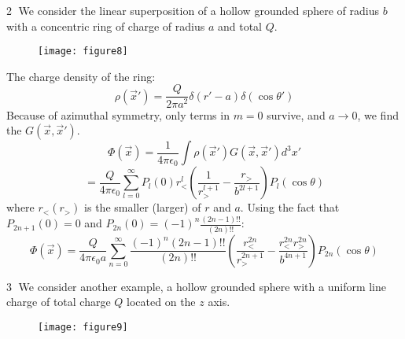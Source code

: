 \documentclass{article}
\begin{document}
	\textcircled{2} We consider the linear superposition of a hollow grounded sphere of radius $b$ with a concentric ring of charge of radius $a$ and total $Q$. 
	
	\begin{figure}[h]
		\centering
		\texttt{[image: figure8]}
		\caption{}
		\label{fig:figure8}
	\end{figure}
	
	The charge density of the ring:
	\begin{equation*}
		\rho(\vec{x}') = \frac{Q}{2\pi a^2} \delta(r'-a) \delta(\cos\theta')
	\end{equation*}
	Because of azimuthal symmetry, only terms in $m=0$ survive, and $a \to 0$, we find the $G(\vec{x}, \vec{x}')$.
	\begin{equation*}
		\Phi(\vec{x}) = \frac{1}{4\pi\epsilon_0} \int \rho(\vec{x}') G(\vec{x},\vec{x}') d^3x'
	\end{equation*}
	\begin{equation*}
		= \frac{Q}{4\pi\epsilon_0} \sum_{l=0}^\infty P_l(0) r_<^l \left( \frac{1}{r_>^{l+1}} - \frac{r_>}{b^{2l+1}} \right) P_l(\cos\theta)
	\end{equation*}
	where $r_<(r_>)$ is the smaller (larger) of $r$ and $a$.
	Using the fact that $P_{2n+1}(0)=0$ and $P_{2n}(0)=(-1)^n \frac{(2n-1)!!}{(2n)!!}$:
	\begin{equation*}
		\Phi(\vec{x}) = \frac{Q}{4\pi\epsilon_0 a} \sum_{n=0}^{\infty} \frac{(-1)^n (2n-1)!!}{(2n)!!} \left( \frac{r_<^{2n}}{r_>^{2n+1}} - \frac{r_<^{2n} r_>^{2n}}{b^{4n+1}} \right) P_{2n}(\cos\theta)
	\end{equation*}
	
	\textcircled{3} We consider another example, a hollow grounded sphere with a uniform line charge of total charge $Q$ located on the $z$ axis. 
	
	\begin{figure}[h]
		\centering
		\texttt{[image: figure9]}
		\caption{}
		\label{fig:figure9}
	\end{figure}
	
\end{document}
